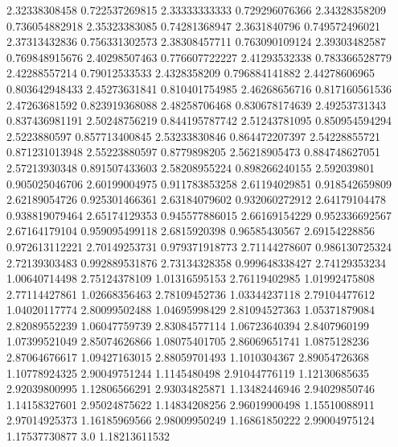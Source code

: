   2.32338308458   0.722537269815
  2.33333333333   0.729296076366
  2.34328358209   0.736054882918
  2.35323383085    0.74281368947
   2.3631840796   0.749572496021
  2.37313432836   0.756331302573
  2.38308457711   0.763090109124
  2.39303482587   0.769848915676
  2.40298507463   0.776607722227
  2.41293532338   0.783366528779
  2.42288557214    0.79012533533
   2.4328358209   0.796884141882
  2.44278606965   0.803642948433
  2.45273631841   0.810401754985
  2.46268656716   0.817160561536
  2.47263681592   0.823919368088
  2.48258706468   0.830678174639
  2.49253731343   0.837436981191
  2.50248756219   0.844195787742
  2.51243781095   0.850954594294
   2.5223880597   0.857713400845
  2.53233830846   0.864472207397
  2.54228855721   0.871231013948
  2.55223880597     0.8779898205
  2.56218905473   0.884748627051
  2.57213930348   0.891507433603
  2.58208955224   0.898266240155
    2.592039801   0.905025046706
  2.60199004975   0.911783853258
  2.61194029851   0.918542659809
  2.62189054726   0.925301466361
  2.63184079602   0.932060272912
  2.64179104478   0.938819079464
  2.65174129353   0.945577886015
  2.66169154229   0.952336692567
  2.67164179104   0.959095499118
   2.6815920398    0.96585430567
  2.69154228856   0.972613112221
  2.70149253731   0.979371918773
  2.71144278607   0.986130725324
  2.72139303483   0.992889531876
  2.73134328358   0.999648338427
  2.74129353234    1.00640714498
  2.75124378109    1.01316595153
  2.76119402985    1.01992475808
  2.77114427861    1.02668356463
  2.78109452736    1.03344237118
  2.79104477612    1.04020117774
  2.80099502488    1.04695998429
  2.81094527363    1.05371879084
  2.82089552239    1.06047759739
  2.83084577114    1.06723640394
   2.8407960199    1.07399521049
  2.85074626866    1.08075401705
  2.86069651741     1.0875128236
  2.87064676617    1.09427163015
  2.88059701493     1.1010304367
  2.89054726368    1.10778924325
  2.90049751244     1.1145480498
  2.91044776119    1.12130685635
  2.92039800995    1.12806566291
  2.93034825871    1.13482446946
  2.94029850746    1.14158327601
  2.95024875622    1.14834208256
  2.96019900498    1.15510088911
  2.97014925373    1.16185969566
  2.98009950249    1.16861850222
  2.99004975124    1.17537730877
            3.0    1.18213611532
